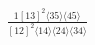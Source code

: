 \documentclass[varwidth, border=5pt]{standalone}
\begin{document}
\begin{my}
$\begin{gathered}
\scriptscriptstyle\frac{1[13]^2⟨35⟩⟨45⟩}{[12]^2⟨14⟩⟨24⟩⟨34⟩}
\end{gathered}$
\end{my}
\end{document}
